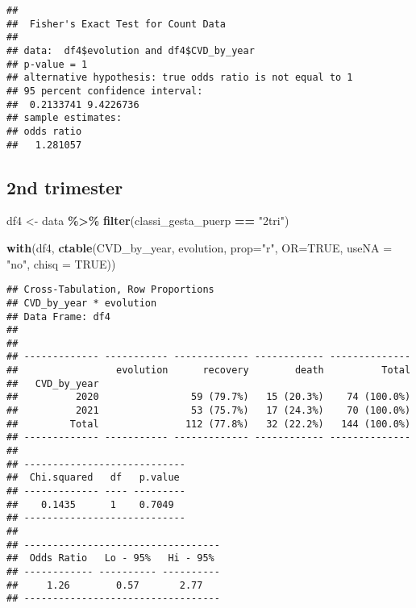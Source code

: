 \documentclass[
]{article}
\newenvironment{Shaded}{\begin{snugshade}}{\end{snugshade}}
\newcommand{\AttributeTok}[1]{\textcolor[rgb]{0.13,0.29,0.53}{#1}}
\newcommand{\ConstantTok}[1]{\textcolor[rgb]{0.56,0.35,0.01}{#1}}
\newcommand{\FunctionTok}[1]{\textcolor[rgb]{0.13,0.29,0.53}{\textbf{#1}}}
\newcommand{\NormalTok}[1]{#1}
\newcommand{\OtherTok}[1]{\textcolor[rgb]{0.56,0.35,0.01}{#1}}
\newcommand{\SpecialCharTok}[1]{\textcolor[rgb]{0.81,0.36,0.00}{\textbf{#1}}}
\newcommand{\StringTok}[1]{\textcolor[rgb]{0.31,0.60,0.02}{#1}}
\begin{document}
\begin{Shaded}
\end{Shaded}

\begin{verbatim}
## 
##  Fisher's Exact Test for Count Data
## 
## data:  df4$evolution and df4$CVD_by_year
## p-value = 1
## alternative hypothesis: true odds ratio is not equal to 1
## 95 percent confidence interval:
##  0.2133741 9.4226736
## sample estimates:
## odds ratio 
##   1.281057
\end{verbatim}

\hypertarget{nd-trimester-8}{%
\subsection{2nd trimester}\label{nd-trimester-8}}

\begin{Shaded}
\begin{Highlighting}[]
\NormalTok{df4 }\OtherTok{\textless{}{-}}\NormalTok{ data }\SpecialCharTok{\%\textgreater{}\%} 
  \FunctionTok{filter}\NormalTok{(classi\_gesta\_puerp }\SpecialCharTok{==} \StringTok{"2tri"}\NormalTok{)}

\FunctionTok{with}\NormalTok{(df4, }\FunctionTok{ctable}\NormalTok{(CVD\_by\_year, evolution, }\AttributeTok{prop=}\StringTok{"r"}\NormalTok{, }\AttributeTok{OR=}\ConstantTok{TRUE}\NormalTok{, }\AttributeTok{useNA =} \StringTok{"no"}\NormalTok{, }\AttributeTok{chisq =} \ConstantTok{TRUE}\NormalTok{))}
\end{Highlighting}
\end{Shaded}

\begin{verbatim}
## Cross-Tabulation, Row Proportions  
## CVD_by_year * evolution  
## Data Frame: df4  
## 
## 
## ------------- ----------- ------------- ------------ --------------
##                 evolution      recovery        death          Total
##   CVD_by_year                                                      
##          2020                59 (79.7%)   15 (20.3%)    74 (100.0%)
##          2021                53 (75.7%)   17 (24.3%)    70 (100.0%)
##         Total               112 (77.8%)   32 (22.2%)   144 (100.0%)
## ------------- ----------- ------------- ------------ --------------
## 
## ----------------------------
##  Chi.squared   df   p.value 
## ------------- ---- ---------
##    0.1435      1    0.7049  
## ----------------------------
## 
## ----------------------------------
##  Odds Ratio   Lo - 95%   Hi - 95% 
## ------------ ---------- ----------
##     1.26        0.57       2.77   
## ----------------------------------
\end{verbatim}
\end{document}
